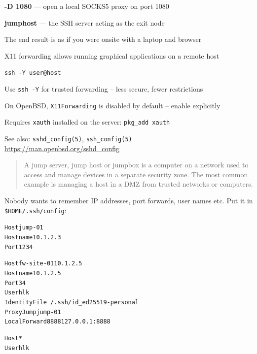 \documentclass[Screen16to9,17pt]{foils}
\begin{document}
\begin{list2}
\item {\bf -D 1080} --- open a local SOCKS5 proxy on port 1080
\item {\bf jumphost} --- the SSH server acting as the exit node
\item The end result is as if you were onsite with a laptop and browser
\end{list2}


X11 forwarding allows running graphical applications on a remote host

\verb+ssh -Y user@host+

\begin{list1}
\item Use \verb+ssh -Y+ for trusted forwarding -- less secure, fewer restrictions
\item On OpenBSD, \verb+X11Forwarding+ is disabled by default -- enable explicitly
\item Requires \verb+xauth+ installed on the server: \verb+pkg_add xauth+
\item See also: \verb+sshd_config(5)+, \verb+ssh_config(5)+\\
\url{https://man.openbsd.org/sshd_config}
\end{list1}



\begin{quote}
A jump server, jump host or jumpbox is a computer on a network used to access and manage devices in a separate security zone. The most common example is managing a host in a DMZ from trusted networks or computers.
\end{quote}




Nobody wants to remember IP addresses, port forwards, user names etc. Put it in \verb+$HOME/.ssh/config+:
\begin{alltt}\footnotesize

Host jump-01
  Hostname 10.1.2.3
  Port 1234

Host fw-site-01 10.1.2.5
  Hostname 10.1.2.5
  Port 34
  User hlk
  IdentityFile ~/.ssh/id_ed25519-personal
  ProxyJump jump-01
  LocalForward 8888 127.0.0.1:8888

Host *
      User hlk
\end{alltt}
\end{document}
